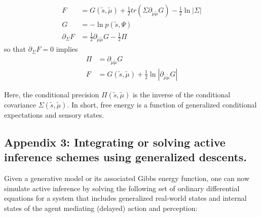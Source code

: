 \documentclass[a4paper]{article} %
\begin{document}
\begin{align} 
F &= G(\tilde{s}, \tilde{\mu}) + \frac{1}{2} tr( \Sigma \partial_{\tilde{\mu} \tilde{\mu}} G ) - \frac{1}{2} \ln | \Sigma |  \nonumber \\%
G &= - \ln p(\tilde{s} , \Psi) \nonumber \\%
\partial_\Sigma F &= \frac{1}{2} \partial_{\tilde{\mu} \tilde{\mu}} G  - \frac{1}{2} \Pi 
\label{eq:app2-1} %
\end{align}%
so that $\partial_\Sigma F = 0$ implies
\begin{align}
\Pi &= \partial_{\tilde{\mu} \tilde{\mu}} G \nonumber \\%
F &= G(\tilde{s}, \tilde{\mu}) + \frac{1}{2} \ln | \partial_{\tilde{\mu} \tilde{\mu}} G | \label{eq:app2-2} %
\end{align}%


Here, the conditional precision $\Pi(\tilde{s}, \tilde{\mu})$ is the inverse of the conditional covariance $\Sigma(\tilde{s}, \tilde{\mu})$. In short, free energy is a function of generalized conditional expectations and sensory states.

\subsection{Appendix 3: Integrating or solving active inference schemes using generalized descents.}

Given a generative model or its associated Gibbs energy function, one can now simulate active inference by solving the following set of ordinary differential equations for a system that includes generalized real-world states and internal states of the agent mediating (delayed) action and perception:
\end{document}

